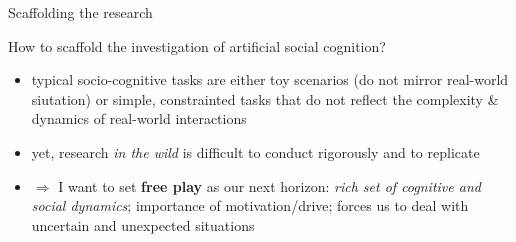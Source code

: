 \documentclass[compress]{beamer}
\begin{document}







\begin{frame}{Scaffolding the research}

    How to scaffold the investigation of artificial social cognition?
    \pause

    \begin{itemize}
        \item<+-> typical socio-cognitive tasks are either toy scenarios (\ie do not mirror
            real-world siutation) or simple, constrainted tasks that do not
            reflect the complexity \& dynamics of real-world interactions
        \item<+-> yet, research \emph{in the wild} is difficult to conduct
            rigorously and to replicate
        \item<+-> $\Rightarrow$ I want to set {\bf free play} as our next horizon: \emph{rich set of cognitive and
            social dynamics}; importance of motivation/drive; forces us to deal
            with uncertain and unexpected situations
    \end{itemize}
\end{frame}



\end{document}

